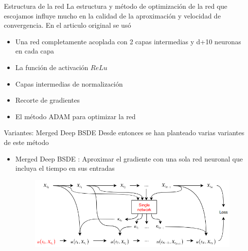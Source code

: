 \documentclass[aspectratio=169,xcolor=dvipsnames]{beamer}
\begin{document}
\begin{frame}{Estructura de la red}
	La estructura y método de optimización de la red que escojamos influye mucho en la calidad de la aproximación y velocidad de convergencia. En el articulo original se usó
	\begin{itemize}
		\item Una red completamente acoplada con 2 capas intermedias y d+10 neuronas en cada capa
		\item La función de activación $ReLu$
		\item Capas intermedias de normalización
		\item Recorte de gradientes 
		\item El método ADAM para optimizar la red
	\end{itemize}
\end{frame}

\begin{frame}{Variantes: Merged Deep BSDE}
	Desde entonces se han planteado varias variantes de este método
	\begin{itemize}
		\item Merged Deep BSDE \parencite{chan-wai-nam_machine_2018}: Aproximar el gradiente con una sola red neuronal que incluya el tiempo en sus entradas
		\begin{figure}
			\centering
			\includegraphics[width=\linewidth]{images/MergedBSDE}
			\label{fig:mergedbsde}
		\end{figure}
	\end{itemize}
\end{frame}
\end{document}
